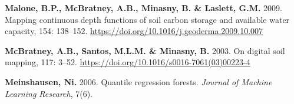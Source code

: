 \documentclass[
  10pt,
  b5paper,
  oneside]{book}
\newlength{\cslhangindent}
\newlength{\cslentryspacingunit} %
\newenvironment{CSLReferences}[2] %
 {%
  \setlength{\parindent}{0pt}
  \ifodd #1
  \let\oldpar\par
  \def\par{\hangindent=\cslhangindent\oldpar}
  \fi
  \setlength{\parskip}{#2\cslentryspacingunit}
 }%
 {}
\begin{document}
\begin{CSLReferences}{0}{0}
\leavevmode{}%
\textbf{Malone, B.P., McBratney, A.B., Minasny, B. \& Laslett, G.M.} 2009. Mapping continuous depth functions of soil carbon storage and available water capacity, 154: 138--152. \url{https://doi.org/10.1016/j.geoderma.2009.10.007}

\leavevmode{}%
\textbf{McBratney, A.B., Santos, M.L.M. \& Minasny, B.} 2003. On digital soil mapping, 117: 3--52. \url{https://doi.org/10.1016/s0016-7061(03)00223-4}

\leavevmode{}%
\textbf{Meinshausen, Ni.} 2006. Quantile regression forests. \emph{Journal of Machine Learning Research}, 7(6).

\end{CSLReferences}


\end{document}
